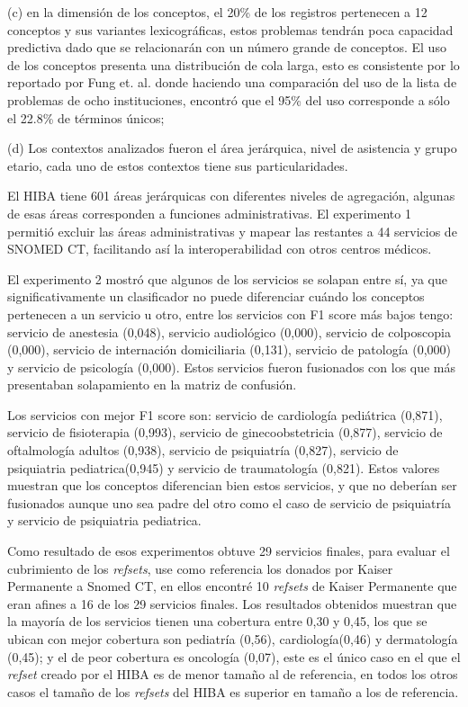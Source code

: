 (c) en la dimensión de los conceptos, el 20\% de los registros pertenecen a 12 conceptos y sus variantes lexicográficas, estos problemas tendrán poca capacidad predictiva dado que se relacionarán con un número grande de conceptos. El uso de los conceptos presenta una distribución de cola larga, esto es consistente por lo reportado por Fung et. al.\cite{Fung2015AnCT} donde haciendo una comparación del uso de la lista de problemas de ocho instituciones, encontró que el 95\% del uso corresponde a sólo el 22.8\% de términos únicos;

(d) Los contextos analizados fueron el área jerárquica, nivel de asistencia y grupo etario, cada uno de estos contextos tiene sus particularidades.

El HIBA tiene 601 áreas jerárquicas con diferentes niveles de agregación, algunas de esas áreas corresponden a funciones administrativas. El experimento 1 permitió excluir las áreas administrativas y mapear las restantes a  44 servicios de SNOMED CT, facilitando así la interoperabilidad con otros centros médicos. 

El experimento 2 mostró que algunos de los servicios se solapan entre sí, ya que significativamente un clasificador no puede diferenciar cuándo los conceptos pertenecen a un servicio u otro, entre los servicios con F1 score más bajos tengo: servicio de anestesia (0,048), servicio audiológico (0,000), servicio de colposcopia (0,000), servicio de internación domiciliaria (0,131), servicio de patología (0,000) y servicio de psicología (0,000). Estos servicios fueron fusionados con los que más presentaban solapamiento en la matriz de confusión.

Los servicios con mejor F1 score son: servicio de cardiología pediátrica (0,871), servicio de fisioterapia (0,993), servicio de ginecoobstetricia (0,877), servicio de oftalmología adultos (0,938), servicio de psiquiatría (0,827), servicio de psiquiatria pediatrica(0,945) y  servicio de traumatología (0,821). Estos valores muestran que los conceptos diferencian bien estos servicios, y que no deberían ser fusionados aunque uno sea padre del otro como el caso de  servicio de psiquiatría y servicio de psiquiatria pediatrica.

Como resultado de esos experimentos obtuve 29 servicios finales, para evaluar el cubrimiento de los \textit{refsets}, use como referencia los donados por Kaiser Permanente a Snomed CT, en ellos encontré 10 \textit{refsets} de Kaiser Permanente que eran afines a 16 de los 29 servicios finales. Los resultados obtenidos muestran que la mayoría de los servicios tienen una cobertura entre 0,30 y 0,45, los que se ubican con mejor cobertura son pediatría (0,56), cardiología(0,46) y dermatología (0,45); y el de peor cobertura es oncología (0,07), este es el único caso en el que el \textit{refset} creado por el HIBA es de menor tamaño al de referencia, en todos los otros casos el tamaño de los \textit{refsets} del HIBA es superior en tamaño a los de referencia. 


